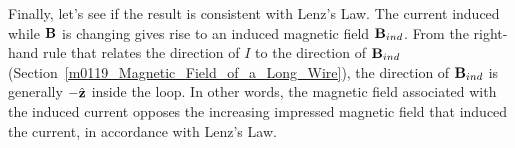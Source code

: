 \begin{example}
\begin{mdframed}[backgroundcolor=brown!20,linecolor=brown!20]
Finally, let's see if the result is consistent with Lenz's Law.
The current induced while ${\bf B}$ is changing gives rise to an induced magnetic field ${\bf B}_{ind}$.   
From the right-hand rule 
that relates the direction of $I$  to the direction of ${\bf B}_{ind}$ (Section~\ref{m0119_Magnetic_Field_of_a_Long_Wire}), the direction of ${\bf B}_{ind}$ is generally $-\hat{\bf z}$ inside the loop.  
In other words, the magnetic field associated with the induced current opposes the increasing impressed magnetic field that induced the current, in accordance with Lenz's Law.  

\end{mdframed}
\end{example}


